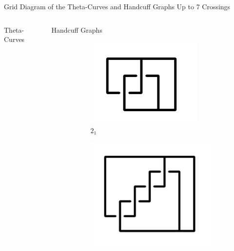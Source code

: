 \documentclass[final]{beamer}
\begin{document}
\begin{frame}[t]
\begin{alertblock}{Grid Diagram of the Theta-Curves and Handcuff Graphs Up to 7 Crossings}
\begin{columns}[t]
\begin{column}{0.5\textwidth}
\begin{alertblock}{Theta-Curves}
  \end{alertblock}
\end{column}
\begin{column}{0.5\textwidth}
  \begin{alertblock}{Handcuff Graphs}
  \begin{figure}
    \begin{subfigure}{0.075\textwidth}
    \includegraphics[width=\columnwidth]{../Midterm_Poster/grid_diagram/handcuff_2_1.png}
    \caption{$2_{1}$} 
    \end{subfigure}
    \begin{subfigure}{0.075\textwidth}
    \includegraphics[width=\columnwidth]{../Midterm_Poster/grid_diagram/handcuff_4_1.png}

\end{subfigure}
\end{figure}
\end{alertblock}
\end{column}
\end{columns}
\end{alertblock}
\end{frame}
\end{document}
